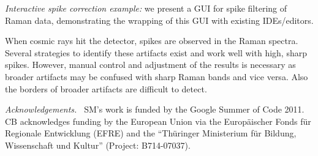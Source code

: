 \documentclass[11pt, a4paper]{article}
\begin{document}
\emph{Interactive spike correction example:} we present a GUI for spike
filtering of Raman data, demonstrating the wrapping of this GUI with existing
IDEs/editors.

When cosmic rays hit the detector, spikes are observed in the Raman spectra.
Several strategies to identify these artifacts exist and work well with high,
sharp spikes. However, manual control and adjustment of the results is necessary
as broader artifacts may be confused with sharp Raman bands and vice versa. Also
the borders of broader artifacts are difficult to detect.

\emph{Acknowledgements.~} SM's work is funded by the Google Summer of Code 2011.
CB acknowledges funding by the European Union via the Europäischer Fonds für
Regionale Entwicklung (EFRE) and the ``Thüringer Ministerium für Bildung,
Wissenschaft und Kultur'' (Project: B714-07037).
\end{document}

